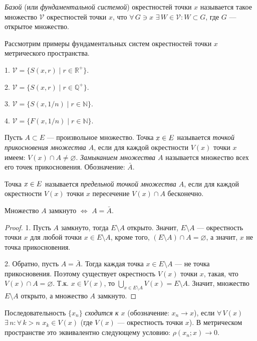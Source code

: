 \documentclass[10pt,titlepage, a4paper]{article}
\begin{document}
\begin{defen}
\emph{Базой} (или \emph{фундаментальной системой}) окрестностей
точки $x$ называется такое множество $\mathcal{V}$ окрестностей
точки $x$, что $\forall\,G\ni x$ $\exists\,W\in\mathcal{V}:W\subset
G$, где $G$ --- открытое множество.
\end{defen}

Рассмотрим примеры фундаментальных систем окрестностей точки $x$
метрического пространства.

\prim

1. $\mathcal{V}=\{S(x,r)\mid r\in\mathbb{R}^+\}$.

2. $\mathcal{V}=\{S(x,r)\mid r\in\mathbb{Q}^+\}$.

3. $\mathcal{V}=\{S(x,1/n)\mid r\in\mathbb{N}\}$.

4. $\mathcal{V}=\{F(x,1/n)\mid r\in\mathbb{N}\}$.

\begin{defen}
Пусть $A\subset E$ --- произвольное множество. Точка $x\p\in E$
называется \emph{точкой прикосновения множества $A$}, если для
каждой окрестности $V(x)$ точки $x$ имеем: $V(x)\cap
A\neq\varnothing$. \emph{Замыканием множества $A$} называется
множество всех его точек прикосновения. Обозначение: $\bar{A}$.

Точка $x\p\in E$ называется \emph{предельной точкой множества $A$},
если для каждой окрестности $V(x)$ точки $x$ пересечение $V(x)\cap
A$ бесконечно.
\end{defen}

\begin{predl}
Множество $A$ замкнуто $\Leftrightarrow$ $A=\bar{A}$.
\end{predl}

\begin{proof}
1. Пусть $A$ замкнуто, тогда $E\setminus A$ открыто. Значит,
$E\setminus A$
--- окрестность точки $x$ для любой точки $x\in E\setminus A$,
кроме того, $(E\setminus A)\cap A=\varnothing$, а значит, $x$ не
точка прикосновения.

2. Обратно, пусть $A=\bar{A}$. Тогда каждая точка $x\in E\setminus
A$ --- не точка прикосновения. Поэтому существует окрестность $V(x)$
точки $x$, такая, что $V(x)\cap A=\varnothing$. Т.к. $x\in V(x)$, то
$\bigcup\limits_{x\in E\setminus A}V(x)=E\setminus A$. Значит,
множество $E\setminus A$ открыто, а множество $A$ замкнуто.
\end{proof}

\begin{defen}
Последовательность $\{x_n\}$ \emph{сходится к $x$} (обозначение:
$x_n\to x$), если $\forall\, V(x)$ $\exists\,n:\forall\,k>n$ $x_k\in
V(x)$ (где $V(x)$ --- окрестность точки $x$). В метрическом
пространстве это эквивалентно следующему условию: $\rho(x_n;x)\to
0$.
\end{defen}
\end{document}
